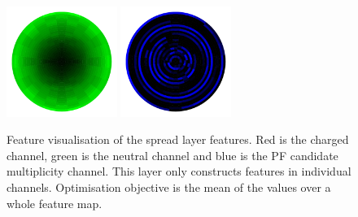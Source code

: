 \begin{figure}[h!]
\begin{center}
        \includegraphics[width=0.32\textwidth]{figures/appendix_featurevis/spread_19.pdf}
        \includegraphics[width=0.32\textwidth]{figures/appendix_featurevis/spread_32.pdf}
    \end{center}
    \caption{Feature visualisation of the spread layer features. Red is the charged \pt channel, green is the neutral \pt channel
             and blue is the PF candidate multiplicity channel. This layer only constructs features in individual channels.
             Optimisation objective is the mean of the values over a whole feature map.}
\end{figure}

